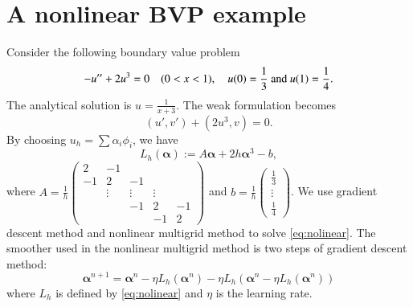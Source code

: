 \section{A nonlinear BVP example}
 Consider the following boundary value problem
$$
-u''+2u^3=0 \quad(0< x < 1), \quad u(0)=\frac{1}{3}\hbox{~and~}u(1)=\frac{1}{4}.
$$
The analytical solution is  $u=\frac{1}{x+3}$. The weak formulation becomes
\begin{equation}
(u',v')+(2u^3,v)=0.
\end{equation}
By choosing $u_h=\sum \alpha_i \phi_i$, we have
\begin{equation}\label{eq:nolinear}
L_h({\bm \alpha}):=A{\bm \alpha}+2h{\bm \alpha}^3-b,
\end{equation}
where
$A =\frac{1}{h}
\begin{pmatrix}
2 & -1 &  &&\\
-1 & 2 & -1&&\\
   &\vdots&\vdots&\vdots&\\
   &&-1&2&-1\\
   &&&-1&2
\end{pmatrix}$ and
$b =\frac{1}{h}
\begin{pmatrix}
\frac{1}{3}\\
\vdots\\
\frac{1}{4}\end{pmatrix}$.  
We use gradient descent method and nonlinear multigrid method to solve \eqref{eq:nolinear}. The smoother used in the 
nonlinear multigrid method is two steps of gradient descent method: 
$$
\bm \alpha^{n+1}=\bm \alpha^n-\eta L_h(\bm \alpha^n) -\eta L_h(\bm \alpha^n-\eta L_h(\bm \alpha^n))
$$
where $L_h$ is defined by \eqref{eq:nolinear} and $\eta$ is the learning rate. 

